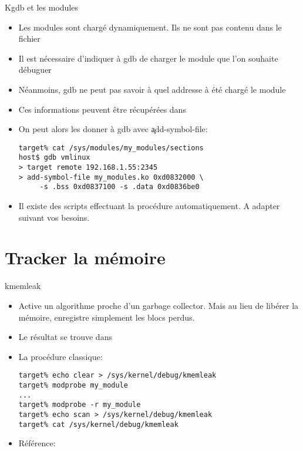 \begin{frame}[fragile=singleslide]{Kgdb et les modules}
  \begin{itemize} 
  \item Les modules sont chargé dynamiquement. Ils ne sont pas contenu
    dans le fichier 
  \item Il  est nécessaire d'indiquer à  gdb de charger  le module que
    l'on souhaite débuguer
  \item Néanmoins, gdb ne peut pas savoir à quel addresse à été chargé
    le module
  \item    Ces    informations    peuvent   être    récupérées    dans
  \item On peut alors les donner à gdb avec \c{add-symbol-file}:
    \begin{lstlisting} 
target% cat /sys/modules/my_modules/sections
host$ gdb vmlinux
> target remote 192.168.1.55:2345
> add-symbol-file my_modules.ko 0xd0832000 \
     -s .bss 0xd0837100 -s .data 0xd0836be0
    \end{lstlisting} 
  \item    Il   existe   des    scripts   effectuant    la   procédure
    automatiquement. A adapter suivant vos besoins.
  \end{itemize}
\end{frame} 

\section{Tracker la mémoire}

\begin{frame}[fragile=singleslide]{kmemleak}
  \begin{itemize} 
  \item Active  un algorithme proche  d'un garbage collector.  Mais au
    lieu  de  libérer  la  mémoire, enregistre  simplement  les  blocs
    perdus.
  \item Le résultat se trouve dans 
  \item La procédure classique:
    \begin{lstlisting} 
target% echo clear > /sys/kernel/debug/kmemleak
target% modprobe my_module
...
target% modprobe -r my_module
target% echo scan > /sys/kernel/debug/kmemleak
target% cat /sys/kernel/debug/kmemleak
    \end{lstlisting} 
  \item Référence: 
  \end{itemize} 
\end{frame}


